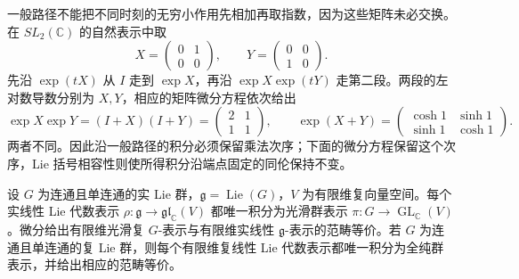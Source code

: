 \ProseParagraphBreak
一般路径不能把不同时刻的无穷小作用先相加再取指数，因为这些矩阵未必交换。在 \(SL_2(\mathbb C)\) 的自然表示中取
\[
	X=\begin{pmatrix}0&1\\0&0\end{pmatrix},\qquad
	Y=\begin{pmatrix}0&0\\1&0\end{pmatrix}.
\]
先沿 \(\exp(tX)\) 从 \(I\) 走到 \(\exp X\)，再沿 \(\exp X\exp(tY)\) 走第二段。两段的左对数导数分别为 \(X,Y\)，相应的矩阵微分方程依次给出
\[
	\exp X\exp Y=(I+X)(I+Y)=\begin{pmatrix}2&1\\1&1\end{pmatrix},
	\qquad
	\exp(X+Y)=\begin{pmatrix}\cosh1&\sinh1\\\sinh1&\cosh1\end{pmatrix}.
\]
两者不同。因此沿一般路径的积分必须保留乘法次序；下面的微分方程保留这个次序，Lie 括号相容性则使所得积分沿端点固定的同伦保持不变。

\begin{theorem}\label{b5:thm:lie-representation-integration}
	设 \(G\) 为连通且单连通的实 Lie 群，\(\mathfrak g=\operatorname{Lie}(G)\)，\(V\) 为有限维复向量空间。每个实线性 Lie 代数表示 \(\rho:\mathfrak g\to\mathfrak{gl}_{\mathbb C}(V)\) 都唯一积分为光滑群表示 \(\pi:G\to\operatorname{GL}_{\mathbb C}(V)\)。微分给出有限维光滑复 \(G\)-表示与有限维实线性 \(\mathfrak g\)-表示的范畴等价。若 \(G\) 为连通且单连通的复 Lie 群，则每个有限维复线性 Lie 代数表示都唯一积分为全纯群表示，并给出相应的范畴等价。
\end{theorem}

